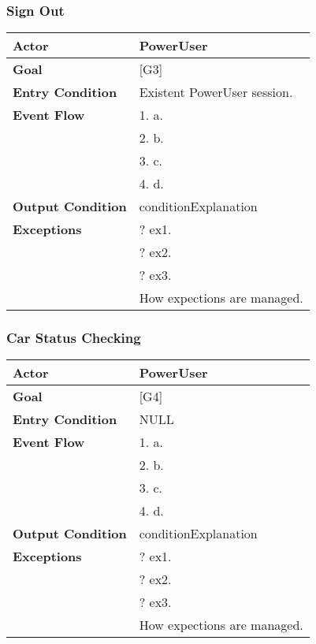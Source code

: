 \subsubsection{Sign Out}
\begin{tabular}{| l | p{8cm} |}
\hline
\textbf{Actor}      &       PowerUser \\
\hline
\textbf{Goal}       &       [G3]\\
\hline
\textbf{Entry Condition} &  Existent PowerUser session.\\
\hline
\textbf{Event Flow}     &   1.	a.\\&
                                            2.	b.\\&
                                            3.	c.\\&
                                            4.  d.\\
\hline
\textbf{Output Condition} & conditionExplanation\\
\hline
\textbf{Exceptions} &       ?   ex1.\\& 
                            ?	ex2.\\&
                            ?	ex3.\\& 
                           How expections are managed.\\
\hline
\end{tabular} 


\subsubsection{Car Status Checking}
\begin{tabular}{| l | p{8cm} |}
\hline
\textbf{Actor}      &       PowerUser \\
\hline
\textbf{Goal}       &       [G4]\\
\hline
\textbf{Entry Condition} &  NULL\\
\hline
\textbf{Event Flow}     &   1.	a.\\&
                                            2.	b.\\&
                                            3.	c.\\&
                                            4.  d.\\
\hline
\textbf{Output Condition} & conditionExplanation\\
\hline
\textbf{Exceptions} &       ?   ex1.\\& 
                            ?	ex2.\\&
                            ?	ex3.\\& 
                           How expections are managed.\\
\hline
\end{tabular} 

